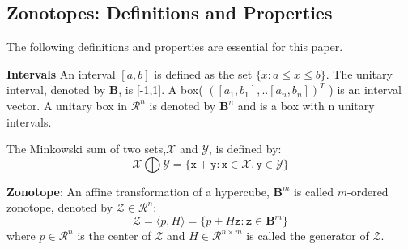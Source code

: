 \subsection{Zonotopes: Definitions and Properties}
The following definitions and properties are essential for this paper.
\begin{definition}\textbf{Intervals}
An interval $[a,b]$ is defined as the set $\{x : a \leq x \leq b\}$. The unitary interval, denoted by $\textbf{B}$, is [-1,1]. A box( $( [a_1, b_1],..[a_n, b_n] )^T$ ) is an interval vector. A unitary box in $\mathcal{R}^n$ is denoted by $\textbf{B}^n$ and is a box with n unitary intervals.
\end{definition}
\begin{definition}
The Minkowski sum of two sets,$\mathcal{X}$ and $\mathcal{Y}$, is defined by: 
\begin{equation}
\mathcal{X} \bigoplus \mathcal{Y} = \{\texttt{x} + \texttt{y}: \texttt{x} \in \mathcal{X}, \texttt{y} \in \mathcal{Y}\}
\end{equation}
\end{definition}
\begin{definition}
\textbf{Zonotope}:
An affine transformation of a hypercube, $\textbf{B}^m$ is called $m$-ordered zonotope, denoted by $\mathcal{Z}\in \mathcal{R}^n$:\\
\begin{equation}
\mathcal{Z} = \langle p, H \rangle = \{p+ H\texttt{z}: \texttt{z} \in \textbf{B}^m\}
\end{equation}
where $p \in \mathcal{R}^n$ is the center of $\mathcal{Z}$ and $H \in \mathcal{R}^{n \times m}$ is called the generator of $\mathcal{Z}$.
\end{definition}

